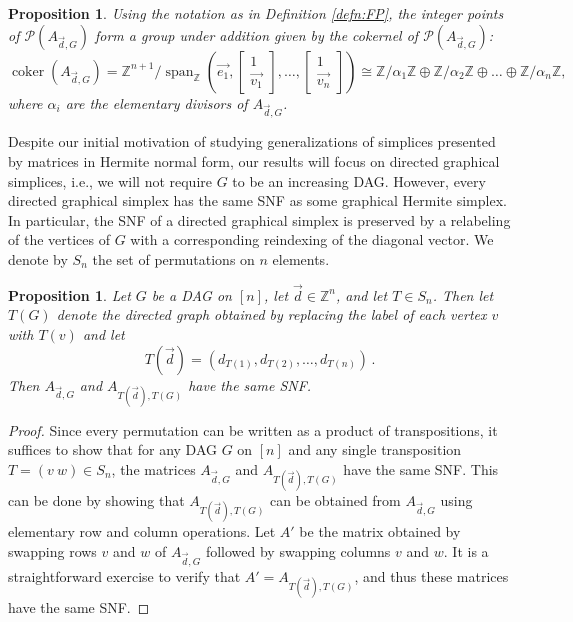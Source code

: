 \documentclass[12pt]{amsart}
\newtheorem{prop}[thm]{Proposition}
\theoremstyle{definition}
\numberwithin{equation}{section}
\newcommand{\ring}[1]{\ensuremath{\mathbb{#1}}}
\renewcommand\>{\rangle}
\newcommand\<{\langle}
\newcommand\0{\mathbf{0}}
\newcommand\ZZ{\ring{Z}}
\DeclareMathOperator\coker{coker}
\DeclareMathOperator{\Span}{span}
\begin{document}
\begin{prop}\label{thm:SNF_group}
	Using the notation as in Definition \ref{defn:FP}, the integer points of $\mathcal{P}(A_{\vec{d}, G})$ form a group under addition given by the cokernel of $\mathcal P(A_{\vec{d}, G})$:
	\[\coker(A_{\vec{d}, G}) = \ZZ^{n+1} / \Span_\ZZ\left(\vec{e_1}, \begin{bmatrix}
		1 \\ \vec{v_1}
	\end{bmatrix}, \dots, \begin{bmatrix}
		1 \\ \vec{v_n}
	\end{bmatrix}\right) \cong \ZZ/\alpha_1\ZZ \oplus \ZZ/\alpha_2\ZZ \oplus \dots \oplus \ZZ/\alpha_n \ZZ,\]
	where $\alpha_i$ are the elementary divisors of $A_{\vec{d}, G}$.
\end{prop}

Despite our initial motivation of studying generalizations of simplices presented by matrices in Hermite normal form, our results will focus on directed graphical simplices, i.e., we will not require $G$ to be an increasing DAG. However, every directed graphical simplex has the same SNF as some graphical Hermite simplex. In particular, the SNF of a directed graphical simplex is preserved by a relabeling of the vertices of $G$ with a corresponding reindexing of the diagonal vector. 
We denote by $S_n$ the set of permutations on $n$ elements.

\begin{prop}\label{thm:relabeling}
	Let $G$ be a DAG on $[n]$, let $\vec{d} \in \ZZ^n$, and let $T \in S_n$. Then let $T(G)$ denote the directed graph obtained by replacing the label of each vertex $v$ with $T(v)$ and let
	\[
	T(\vec{d}) = (d_{T(1)}, d_{T(2)}, \dots ,d_{T(n)})\, .
	\] 
	Then $A_{\vec{d}, G}$ and $A_{T(\vec{d}), T(G)}$ have the same SNF. 
\end{prop}
\begin{proof}
	Since every permutation can be written as a product of transpositions, it suffices to show that for any DAG $G$ on $[n]$ and any single transposition $T = (v\ w) \in S_n$, the matrices $A_{\vec{d}, G}$ and $A_{T(\vec{d}), T(G)}$ have the same SNF. 
	This can be done by showing that $A_{T(\vec{d}), T(G)}$ can be obtained from $A_{\vec{d}, G}$ using elementary row and column operations.
	Let $A'$ be the matrix obtained by swapping rows $v$ and $w$ of $A_{\vec{d}, G}$ followed by swapping columns $v$ and $w$. 
	It is a straightforward exercise to verify that $A' = A_{T(\vec{d}), T(G)}$, and thus these matrices have the same SNF.
\end{proof}
\end{document}
